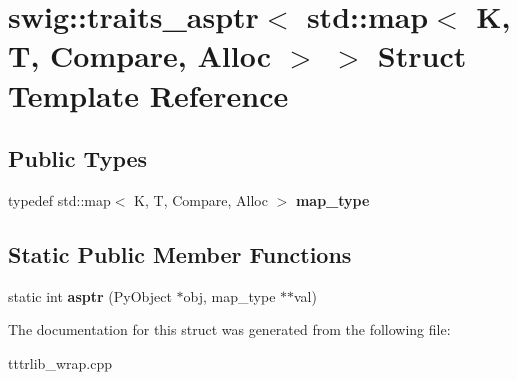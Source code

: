 \hypertarget{structswig_1_1traits__asptr_3_01std_1_1map_3_01_k_00_01_t_00_01_compare_00_01_alloc_01_4_01_4}{}\section{swig\+:\+:traits\+\_\+asptr$<$ std\+:\+:map$<$ K, T, Compare, Alloc $>$ $>$ Struct Template Reference}
\label{structswig_1_1traits__asptr_3_01std_1_1map_3_01_k_00_01_t_00_01_compare_00_01_alloc_01_4_01_4}
\subsection*{Public Types}
\begin{DoxyCompactItemize}
\item 
\mbox{\label{structswig_1_1traits__asptr_3_01std_1_1map_3_01_k_00_01_t_00_01_compare_00_01_alloc_01_4_01_4_a601c281ad9967eee64015c692cc41423}} 
typedef std\+::map$<$ K, T, Compare, Alloc $>$ {\bfseries map\+\_\+type}
\end{DoxyCompactItemize}
\subsection*{Static Public Member Functions}
\begin{DoxyCompactItemize}
\item 
\mbox{\label{structswig_1_1traits__asptr_3_01std_1_1map_3_01_k_00_01_t_00_01_compare_00_01_alloc_01_4_01_4_aee64fde1f08f8570c566c93075ef4f61}} 
static int {\bfseries asptr} (Py\+Object $\ast$obj, map\+\_\+type $\ast$$\ast$val)
\end{DoxyCompactItemize}


The documentation for this struct was generated from the following file\+:\begin{DoxyCompactItemize}
\item 
tttrlib\+\_\+wrap.\+cpp\end{DoxyCompactItemize}
